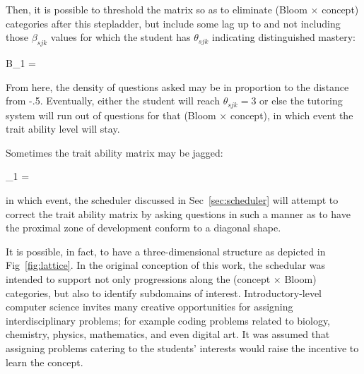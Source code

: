 Then, it is possible to threshold the matrix so as to eliminate (Bloom $\times$
concept) categories after this stepladder, but include some lag up to and not
including those $\beta_{sjk}$ values for which the student has $\theta_{sjk}$
indicating distinguished mastery:

\begin{equations}
B_1 =
\end{equations}
\vspace{12pt}

From here, the density of questions asked may be in proportion to the distance
from -.5.  Eventually, either the student will reach $\theta_{sjk} = 3$ or else
the tutoring system will run out of questions for that (Bloom $\times$
concept), in which event the trait ability level will stay.

Sometimes the trait ability matrix may be jagged:

\begin{equations}
\Theta_1 =
\end{equations}
\vspace{12pt}

in which event, the scheduler discussed in Sec~\ref{sec:scheduler} will attempt
to correct the trait ability matrix by asking questions in such a manner as to
have the proximal zone of development conform to a diagonal shape.

It is possible, in fact, to have a three-dimensional structure as depicted in
Fig~\ref{fig:lattice}.  In the original conception of this work, the schedular
was intended to support not only progressions along the (concept $\times$
Bloom) categories, but also to identify subdomains of interest.
Introductory-level computer science invites many creative opportunities for
assigning interdisciplinary problems; for example coding problems related to
biology, chemistry, physics, mathematics, and even digital art.  It was assumed
that assigning problems catering to the students' interests would raise the
incentive to learn the concept.  

